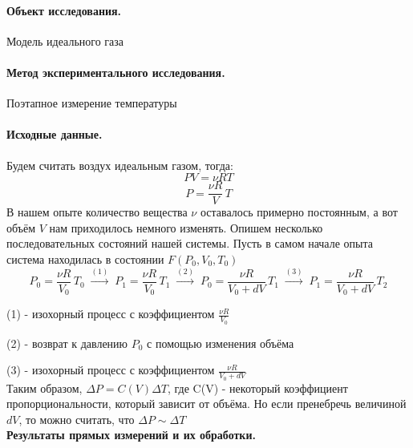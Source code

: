 \documentclass{article}
\begin{document}
	\paragraph{Объект исследования.} Модель идеального газа
	\paragraph{Метод экспериментального исследования.} Поэтапное измерение температуры
	\paragraph{Исходные данные.}
	Будем считать воздух идеальным газом, тогда:
	$$PV=\nu RT $$
	$$ P=\frac{\nu R}{V}\,T$$
	В нашем опыте количество вещества $\nu$ оставалось примерно постоянным, а вот объём $V$ нам приходилось немного изменять. Опишем несколько последовательных состояний нашей системы.
	Пусть в самом начале опыта система находилась в состоянии $F(P_0,V_0,T_0)$
	$$ P_0=\frac{\nu R}{V_0}\,T_0\; \xrightarrow{(1)} \; P_1=\frac{\nu R}{V_0}\,T_1 \;\xrightarrow{(2)}\; P_0=\frac{\nu R}{V_0+dV}\,T_1 \;\xrightarrow{(3)} \; P_1=\frac{\nu R}{V_0+dV}\,T_2$$
	
	(1) - изохорный процесс с коэффициентом $ \frac{\nu R}{V_0} $
	
	(2) - возврат к давлению $P_0$ с помощью изменения объёма
	
	(3) - изохорный процесс с коэффициентом $ \frac{\nu R}{V_0+dV} $\\
	
	Таким образом, $\Delta P=C(V)\Delta T$, где C(V) - некоторый коэффициент пропорциональности, который зависит от объёма. Но если пренебречь величиной $dV$, то можно считать, что $\Delta P \sim \Delta T$\\
	
	\textbf{Результаты прямых измерений и их обработки.}
	
\end{document}
